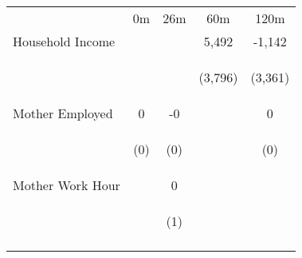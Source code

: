 \begin{tabular}{lcccc}
\hline \noalign{\smallskip} & 0m & 26m & 60m & 120m\\
\noalign{\smallskip}\hline \noalign{\smallskip}Household Income &  &  & 5,492 & -1,142\\
 & \begin{footnotesize}\end{footnotesize} & \begin{footnotesize}\end{footnotesize} & \begin{footnotesize}(3,796)\end{footnotesize} & \begin{footnotesize}(3,361)\end{footnotesize}\\
\noalign{\smallskip}Mother Employed & 0 & -0 &  & 0\\
 & \begin{footnotesize}(0)\end{footnotesize} & \begin{footnotesize}(0)\end{footnotesize} & \begin{footnotesize}\end{footnotesize} & \begin{footnotesize}(0)\end{footnotesize}\\
\noalign{\smallskip}Mother Work Hour &  & 0 &  & \\
 & \begin{footnotesize}\end{footnotesize} & \begin{footnotesize}(1)\end{footnotesize} & \begin{footnotesize}\end{footnotesize} & \begin{footnotesize}\end{footnotesize}\\
\noalign{\smallskip}\hline\end{tabular}\\
